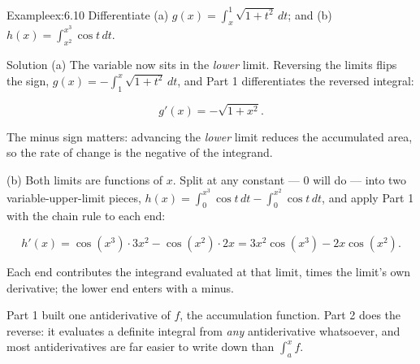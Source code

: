 \documentclass[a4paper,12pt,oneside]{memoir}
\begin{document}
\begin{workedexample}
\begin{envexample}{Example}{ex:6.10}{}
Differentiate (a) \(\displaystyle g(x) = \int_{x}^{1} \sqrt{1 + t^{2}}\,dt\); and (b) \(\displaystyle h(x) = \int_{x^{2}}^{x^{3}} \cos t\,dt\).
\end{envexample}
\begin{envsolution}{Solution}{}{}
(a) The variable now sits in the \emph{lower} limit. Reversing the limits flips the sign, \(g(x) = -\int_{1}^{x} \sqrt{1 + t^{2}}\,dt\), and Part 1 differentiates the reversed integral:

\[ g'(x) = -\sqrt{1 + x^{2}}. \]

The minus sign matters: advancing the \emph{lower} limit reduces the accumulated area, so the rate of change is the negative of the integrand.

(b) Both limits are functions of \(x\). Split at any constant — \(0\) will do — into two variable-upper-limit pieces, \(h(x) = \int_{0}^{x^{3}} \cos t\,dt - \int_{0}^{x^{2}} \cos t\,dt\), and apply Part 1 with the chain rule to each end:

\[ h'(x) = \cos(x^{3})\cdot 3x^{2} - \cos(x^{2})\cdot 2x = 3x^{2}\cos(x^{3}) - 2x\cos(x^{2}). \]

Each end contributes the integrand evaluated at that limit, times the limit’s own derivative; the lower end enters with a minus. \qedmark
\end{envsolution}
\end{workedexample}
Part 1 built one antiderivative of \(f\), the accumulation function. Part 2 does the reverse: it evaluates a definite integral from \emph{any} antiderivative whatsoever, and most antiderivatives are far easier to write down than \(\int_{a}^{x} f\).
\end{document}
